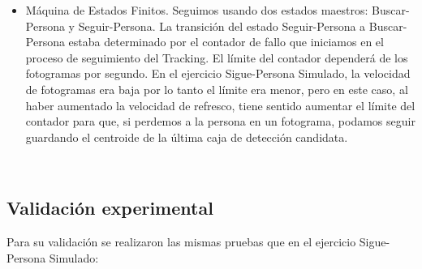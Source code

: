 \begin{itemize}
	\item Máquina de Estados Finitos. Seguimos usando dos estados maestros: Buscar-Persona y Seguir-Persona. La transición del estado Seguir-Persona a Buscar-Persona estaba determinado por el contador de fallo que iniciamos en el proceso de seguimiento del Tracking. El límite del contador dependerá de los fotogramas por segundo. En el ejercicio Sigue-Persona Simulado, la velocidad de fotogramas era baja por lo tanto el límite era menor, pero en este caso, al haber aumentado la velocidad de refresco, tiene sentido aumentar el límite del contador para que, si perdemos a la persona en un fotograma, podamos seguir guardando el centroide de la última caja de detección candidata.
\end{itemize}\




\subsection{Validación experimental}
\label{subsec:validacion_experimental_real}

Para su validación se realizaron las mismas pruebas que en el ejercicio Sigue-Persona Simulado:\\

